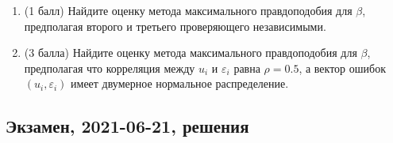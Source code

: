 \begin{enumerate}
\begin{enumerate}
    \item (1 балл) Найдите оценку метода максимального правдоподобия для $\beta$,
    предполагая второго и третьего проверяющего независимыми.
    
    
    \item (3 балла) Найдите оценку метода максимального правдоподобия для $\beta$,
    предполагая что корреляция между $u_i$ и $\varepsilon_i$ равна $\rho = 0.5$, а вектор ошибок $(u_i, \varepsilon_i)$ имеет двумерное нормальное распределение. 
    
\end{enumerate}

\end{enumerate}




\subsection{Экзамен, 2021-06-21, решения}


